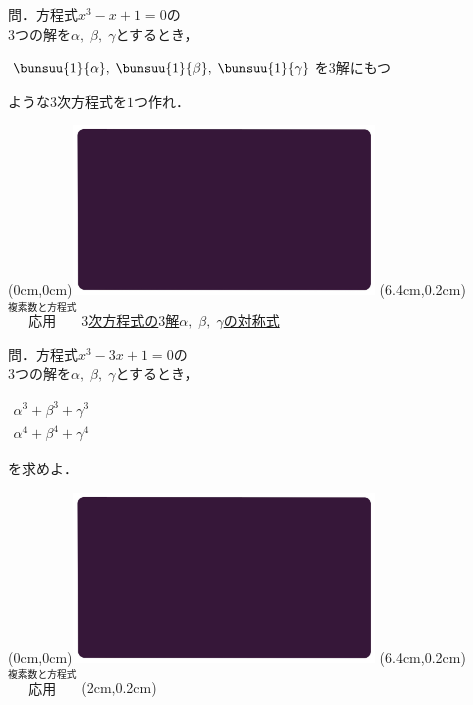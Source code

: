 \documentclass[10pt,
fleqn,
dvipdfmx,
uplatex
]{jsarticle}
\begin{document}
\large
問．方程式$x^3-x+1=0$の\\
\hfill $3$つの解を$\alpha ,\;\beta ,\;\gamma$とするとき，

\LARGE 
\vspace{0.2zw}
\hspace{0.5zw}$\bunsuu{1}{\alpha },\;\bunsuu{1}{\beta },\;\bunsuu{1}{\gamma}$を$3$解にもつ\vspace{0.2zw}

\large
\hfill ような$3$次方程式を$1$つ作れ．

\newpage

\at(0cm,0cm){\includegraphics[width=8cm,bb=0 0 1920 1080]{./youtube/thumbnails/templates/smart_background/複素数と方程式.jpeg}}
\at(6.4cm,0.2cm){\small\color{bradorange}$\overset{\text{複素数と方程式}}{\text{応用}}$}
{\color{orange}\large\underline{$3$次方程式の$3$解$\alpha ,\;\beta ,\;\gamma$の対称式}}\vspace{0.3zw}

\large
問．方程式$x^3-3x+1=0$の\\
\hfill $3$つの解を$\alpha ,\;\beta ,\;\gamma$とするとき，

\huge
\vspace{0.3zw}
\hspace{0.1zw}
$\begin{array}{l}\alpha ^3+\beta ^3+\gamma^3\;\\
\alpha ^4+\beta ^4+\gamma^4
\end{array}$

\large
\vspace{-1.5zw}
\hfill を求めよ．

\newpage

\at(0cm,0cm){\includegraphics[width=8cm,bb=0 0 1920 1080]{./youtube/thumbnails/templates/smart_background/複素数と方程式.jpeg}}
\at(6.4cm,0.2cm){\small\color{bradorange}$\overset{\text{複素数と方程式}}{\text{応用}}$}
\at(2cm,0.2cm){\color{orange}\LARGE\underline{}}\vspace{0.3zw}
\end{document}
